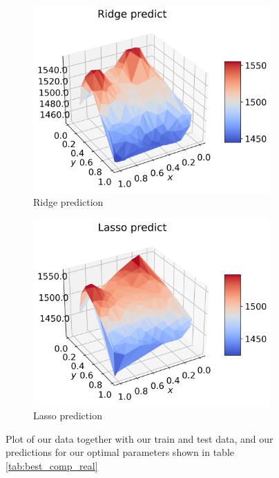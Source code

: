 \documentclass[12pt]{article}
\begin{document}
\begin{figure}[H]
\begin{subfigure}{.5\textwidth}
    \centering
    \includegraphics[width=\textwidth]{../figures/ridge_pred_n40_skip2.png}
    \caption{Ridge prediction}
    \label{fig:real_pred_ridge_skip}
  \end{subfigure}
  \begin{subfigure}{.5\textwidth}
    \centering
    \includegraphics[width=\textwidth]{../figures/lasso_pred_n40_skip2.png}
    \caption{Lasso prediction}
    \label{fig:real_pred_lasos_skip}
  \end{subfigure}
  \caption{Plot of our data together with our train and test data, and our predictions for our optimal parameters shown in table \ref{tab:best_comp_real} }
  \label{fig:pred_real_skip}
\end{figure}
\end{document}
